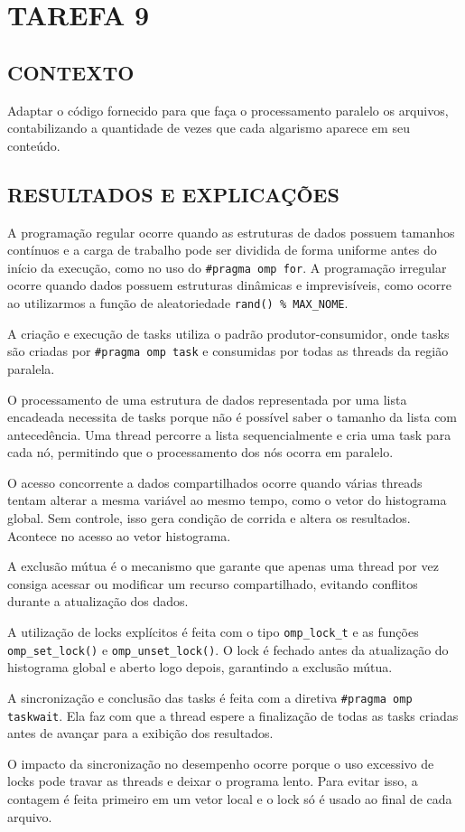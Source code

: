 \documentclass[12pt, openright, oneside, a4paper, brazil]{article}
\newcommand{\subtUm}{CONTEXTO}
\newcommand{\subtDois}{RESULTADOS E EXPLICAÇÕES}
\begin{document}
	\newpage
		\onehalfspacing
		\section{TAREFA 9}
		\subsection{\subtUm}
		\par{Adaptar o código fornecido para que faça o processamento paralelo os arquivos, contabilizando a quantidade de vezes que cada algarismo aparece em seu conteúdo.}
		\subsection{\subtDois}
		\par{A programação regular ocorre quando as estruturas de dados possuem tamanhos contínuos e a carga de trabalho pode ser dividida de forma uniforme antes do início da execução, como no uso do \texttt{\#pragma omp for}. A programação irregular ocorre quando dados possuem estruturas dinâmicas e imprevisíveis, como ocorre ao utilizarmos a função de aleatoriedade \texttt{rand() \% MAX\_NOME}.}
		\par{A criação e execução de tasks utiliza o padrão produtor-consumidor, onde tasks são criadas por \texttt{\#pragma omp task} e consumidas por todas as threads da região paralela.}
		\par{O processamento de uma estrutura de dados representada por uma lista encadeada necessita de tasks porque não é possível saber o tamanho da lista com antecedência. Uma thread percorre a lista sequencialmente e cria uma task para cada nó, permitindo que o processamento dos nós ocorra em paralelo.}
		\par{O acesso concorrente a dados compartilhados ocorre quando várias threads tentam alterar a mesma variável ao mesmo tempo, como o vetor do histograma global. Sem controle, isso gera condição de corrida e altera os resultados. Acontece no acesso ao vetor histograma.}
		\par{A exclusão mútua é o mecanismo que garante que apenas uma thread por vez consiga acessar ou modificar um recurso compartilhado, evitando conflitos durante a atualização dos dados.}
		\par{A utilização de locks explícitos é feita com o tipo \texttt{omp\_lock\_t} e as funções \texttt{omp\_set\_lock()} e \texttt{omp\_unset\_lock()}. O lock é fechado antes da atualização do histograma global e aberto logo depois, garantindo a exclusão mútua.}
		\par{A sincronização e conclusão das tasks é feita com a diretiva \texttt{\#pragma omp taskwait}. Ela faz com que a thread espere a finalização de todas as tasks criadas antes de avançar para a exibição dos resultados.}
		\par{O impacto da sincronização no desempenho ocorre porque o uso excessivo de locks pode travar as threads e deixar o programa lento. Para evitar isso, a contagem é feita primeiro em um vetor local e o lock só é usado ao final de cada arquivo.}
		\par{}
\end{document}
